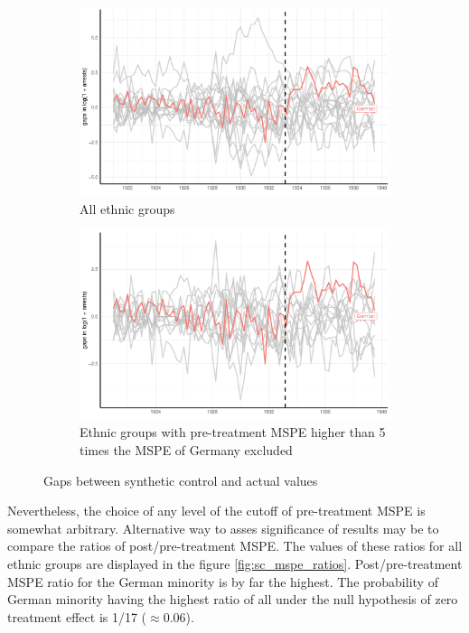 \begin{figure}[hbtp] 
\begin{subfigure}{\textwidth}
\includegraphics[width=0.9\linewidth]{plots/synthetic_control/until_pact/placebo_highlight_all.pdf}
\caption{All ethnic groups}
\label{fig:sc_placebo_gaps_all}
\end{subfigure}
\begin{subfigure}{\textwidth}
\includegraphics[width=0.9\linewidth]{plots/synthetic_control/until_pact/placebo_highlight_mspe_5_lower.pdf}
\caption{Ethnic groups with pre-treatment MSPE higher than 5 times the MSPE of Germany excluded}
\label{fig:sc_placebo_gaps_all_5_times}
\end{subfigure}
\caption{Gaps between synthetic control and actual values}
\label{fig:sc_placebo_gaps}
\end{figure}

Nevertheless, the choice of any level of the cutoff of pre-treatment MSPE %
is somewhat arbitrary. Alternative way to asses significance of results may be to compare the ratios of  post/pre-treatment MSPE.  The values of these ratios for all ethnic groups are displayed in the figure \ref{fig:sc_mspe_ratios}. Post/pre-treatment MSPE ratio for the German minority is by far the highest. The probability of German minority having the highest ratio of all under the null hypothesis of zero treatment effect is 1/17 ($\approx 0.06$). 

